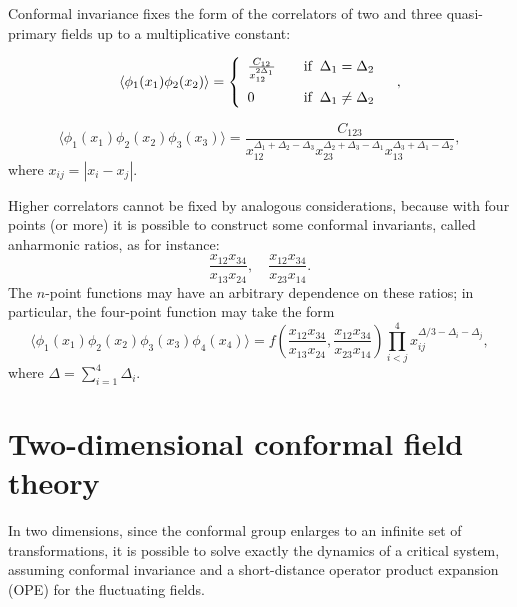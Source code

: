 \documentclass[a4paper,12pt]{report}
\begin{document}
Conformal invariance fixes the form of the correlators of two and three quasi-primary fields up to a
multiplicative constant:

\begin{equation}
\langle\phi_{1}(x_{1})\phi_{2}(x_{2})\rangle=\left\{
\begin{array}{ll}
\frac{C_{12}}{x_{12}^{2\Delta_{1}}} &
\quad  \textrm{if}\;\;\Delta_{1}=\Delta_{2} \medskip \\
0 & \quad \textrm{if}\;\;\Delta_{1}\neq\Delta_{2}\,\,\, \label{2ptd}
\end{array}
\right. \,\, ,
\end{equation}

\begin{equation}\label{3ptd}
\langle\phi_{1}(x_{1})\phi_{2}(x_{2})\phi_{3}(x_{3})\rangle=\frac{C_{123}}{x_{12}^{\Delta_{1}+\Delta_{2}-\Delta_{3}}x_{23}^{\Delta_{2}+\Delta_{3}-\Delta_{1}}x_{13}^{\Delta_{3}+\Delta_{1}-\Delta_{2}}},
\end{equation}
where $x_{ij}=|x_{i}-x_{j}|$.

Higher correlators cannot be fixed by analogous considerations, because with four points (or more) it is possible
to construct some conformal invariants, called anharmonic ratios, as for instance:
\begin{equation}\label{ratiosd}
\frac{x_{12}x_{34}}{x_{13}x_{24}}, \quad \frac{x_{12}x_{34}}{x_{23}x_{14}}.
\end{equation}
The $n$-point functions may have an arbitrary dependence on these ratios; in particular, the four-point function
may take the form
\begin{equation}\label{4ptd}
\langle\phi_{1}(x_{1})\phi_{2}(x_{2})\phi_{3}(x_{3})\phi_{4}(x_{4})\rangle=f\left(\frac{x_{12}x_{34}}{x_{13}x_{24}},
 \frac{x_{12}x_{34}}{x_{23}x_{14}}\right)\prod_{i<j}^{4}x_{ij}^{\Delta/3-\Delta_{i}-\Delta_{j}},
\end{equation}
where $\Delta=\sum_{i=1}^{4}\Delta_{i}$.

\vspace{1cm}

\section{Two-dimensional conformal field theory}

In two dimensions, since the conformal group enlarges to an infinite set of transformations, it is possible to
solve exactly the dynamics of a critical system, assuming conformal invariance and a short-distance operator
product expansion (OPE) for the fluctuating fields.
\end{document}
